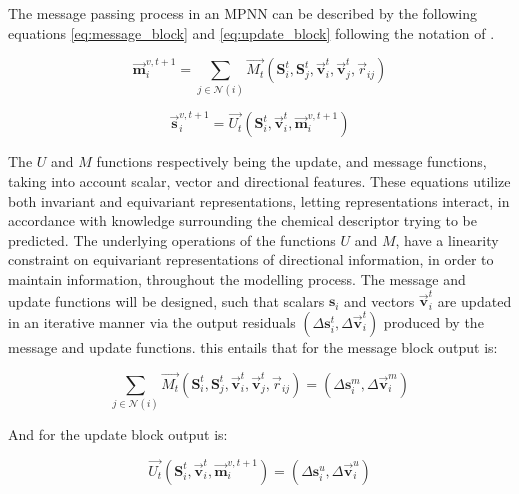 The message passing process in an MPNN can be described by the following equations \ref{eq:message_block} and \ref{eq:update_block}
following the notation of \cite{PAINN}.

\begin{equation}\label{eq:message_block}
    \vec{\mathbf{m}}_{i}^{v,t+1} = \sum_{j \in \mathcal{N}(i)} \vec{M_t}(\mathbf{S}_{i}^{t}, \mathbf{S}_{j}^{t}, \vec{\mathbf{v}}_{i}^{t}, \vec{\mathbf{v}}_{j}^{t}, \vec{r}_{ij})
\end{equation}

\begin{equation}\label{eq:update_block}
    \vec{\mathbf{s}}_{i}^{v,t+1} = \vec{U_t}(\mathbf{S}_{i}^{t}, \vec{\mathbf{v}}_{i}^{t}, \vec{\mathbf{m}}_{i}^{v,t+1})
\end{equation}

The $U$ and $M$ functions respectively being the update, and message functions, taking into account scalar, vector and
directional features. These equations utilize both invariant and equivariant representations, letting
representations interact, in accordance with knowledge surrounding the chemical descriptor trying to be predicted. The underlying
operations of the functions $U$ and $M$, have a linearity constraint on equivariant representations of directional information,
in order to maintain
information, throughout the modelling process\cite{Atz2021}. The message and update functions will be designed, such that scalars $\mathbf{s}_{i}$
and vectors $\vec{\mathbf{v}}_{i}^{t}$ are updated in an iterative manner via the output residuals $(\Delta \mathbf{s}_{i}^{t}, \Delta \vec{\mathbf{v}}_{i}^{t})$ produced by the message and update functions.
this entails that for the message block output is:

\begin{equation}\label{eq:residual_message}
    \sum_{j \in \mathcal{N}(i)} \vec{M_t}(\mathbf{S}_{i}^{t}, \mathbf{S}_{j}^{t}, \vec{\mathbf{v}}_{i}^{t}, \vec{\mathbf{v}}_{j}^{t}, \vec{r}_{ij}) = (\Delta \mathbf{s}_{i}^{m}, \Delta \vec{\mathbf{v}}_{i}^{m})
\end{equation}

And for the update block output is:

\begin{equation}\label{eq:residual_update}
    \vec{U_t}(\mathbf{S}_{i}^{t}, \vec{\mathbf{v}}_{i}^{t}, \vec{\mathbf{m}}_{i}^{v,t+1}) = (\Delta \mathbf{s}_{i}^{u}, \Delta \vec{\mathbf{v}}_{i}^{u})
\end{equation}

